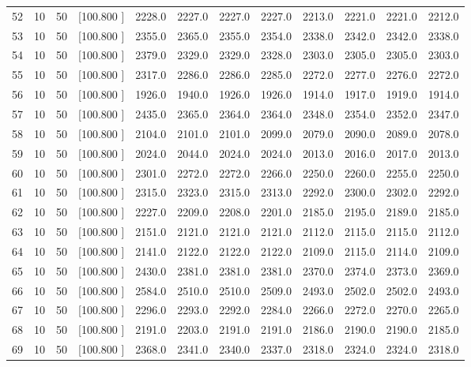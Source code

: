 \documentclass[12pt,a4paper]{article}
\begin{document}
\begin{center}
{\begin{tabular}{r r r r r r r r r r r r}
  52& 10& 50&[100.800   ]&  2228.0&  2227.0&  2227.0&  2227.0&  2213.0&  2221.0&  2221.0&  2212.0\\[-0.02in]
  53& 10& 50&[100.800   ]&  2355.0&  2365.0&  2355.0&  2354.0&  2338.0&  2342.0&  2342.0&  2338.0\\[-0.02in]
  54& 10& 50&[100.800   ]&  2379.0&  2329.0&  2329.0&  2328.0&  2303.0&  2305.0&  2305.0&  2303.0\\[-0.02in]
  55& 10& 50&[100.800   ]&  2317.0&  2286.0&  2286.0&  2285.0&  2272.0&  2277.0&  2276.0&  2272.0\\[-0.02in]
  56& 10& 50&[100.800   ]&  1926.0&  1940.0&  1926.0&  1926.0&  1914.0&  1917.0&  1919.0&  1914.0\\[-0.02in]
  57& 10& 50&[100.800   ]&  2435.0&  2365.0&  2364.0&  2364.0&  2348.0&  2354.0&  2352.0&  2347.0\\[-0.02in]
  58& 10& 50&[100.800   ]&  2104.0&  2101.0&  2101.0&  2099.0&  2079.0&  2090.0&  2089.0&  2078.0\\[-0.02in]
  59& 10& 50&[100.800   ]&  2024.0&  2044.0&  2024.0&  2024.0&  2013.0&  2016.0&  2017.0&  2013.0\\[-0.02in]
  60& 10& 50&[100.800   ]&  2301.0&  2272.0&  2272.0&  2266.0&  2250.0&  2260.0&  2255.0&  2250.0\\[-0.02in]
  61& 10& 50&[100.800   ]&  2315.0&  2323.0&  2315.0&  2313.0&  2292.0&  2300.0&  2302.0&  2292.0\\[-0.02in]
  62& 10& 50&[100.800   ]&  2227.0&  2209.0&  2208.0&  2201.0&  2185.0&  2195.0&  2189.0&  2185.0\\[-0.02in]
  63& 10& 50&[100.800   ]&  2151.0&  2121.0&  2121.0&  2121.0&  2112.0&  2115.0&  2115.0&  2112.0\\[-0.02in]
  64& 10& 50&[100.800   ]&  2141.0&  2122.0&  2122.0&  2122.0&  2109.0&  2115.0&  2114.0&  2109.0\\[-0.02in]
  65& 10& 50&[100.800   ]&  2430.0&  2381.0&  2381.0&  2381.0&  2370.0&  2374.0&  2373.0&  2369.0\\[-0.02in]
  66& 10& 50&[100.800   ]&  2584.0&  2510.0&  2510.0&  2509.0&  2493.0&  2502.0&  2502.0&  2493.0\\[-0.02in]
  67& 10& 50&[100.800   ]&  2296.0&  2293.0&  2292.0&  2284.0&  2266.0&  2272.0&  2270.0&  2265.0\\[-0.02in]
  68& 10& 50&[100.800   ]&  2191.0&  2203.0&  2191.0&  2191.0&  2186.0&  2190.0&  2190.0&  2185.0\\[-0.02in]
  69& 10& 50&[100.800   ]&  2368.0&  2341.0&  2340.0&  2337.0&  2318.0&  2324.0&  2324.0&  2318.0\\[-0.02in]

\end{tabular}}
\end{center}
\end{document}
